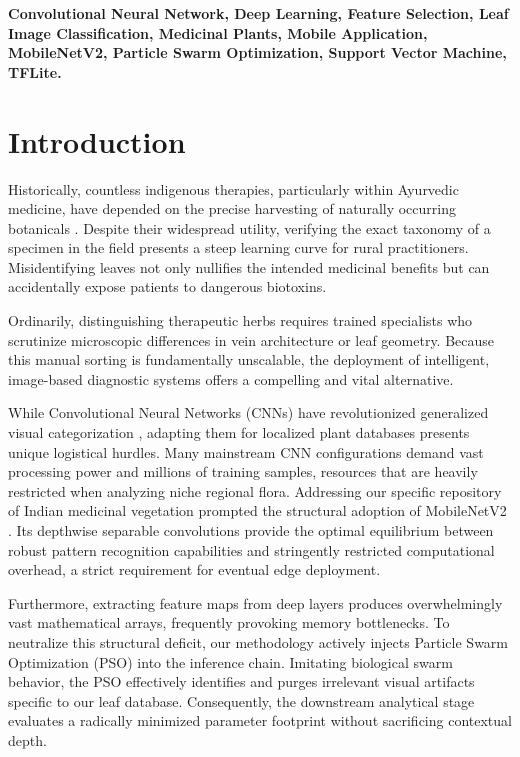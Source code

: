 \documentclass[conference]{IEEEtran}
\begin{document}
\begin{IEEEkeywords}
\textbf{Convolutional Neural Network, Deep Learning, Feature Selection, Leaf Image Classification, Medicinal Plants, Mobile Application, MobileNetV2, Particle Swarm Optimization, Support Vector Machine, TFLite.}
\end{IEEEkeywords}

\section{Introduction}

Historically, countless indigenous therapies, particularly within Ayurvedic medicine, have depended on the precise harvesting of naturally occurring botanicals \cite{pandey2014}. Despite their widespread utility, verifying the exact taxonomy of a specimen in the field presents a steep learning curve for rural practitioners. Misidentifying leaves not only nullifies the intended medicinal benefits but can accidentally expose patients to dangerous biotoxins.

Ordinarily, distinguishing therapeutic herbs requires trained specialists who scrutinize microscopic differences in vein architecture or leaf geometry. Because this manual sorting is fundamentally unscalable, the deployment of intelligent, image-based diagnostic systems offers a compelling and vital alternative.

While Convolutional Neural Networks (CNNs) have revolutionized generalized visual categorization \cite{lecun2015, he2016, yosinski2014}, adapting them for localized plant databases presents unique logistical hurdles. Many mainstream CNN configurations demand vast processing power and millions of training samples, resources that are heavily restricted when analyzing niche regional flora. Addressing our specific repository of Indian medicinal vegetation prompted the structural adoption of MobileNetV2 \cite{howard2018}. Its depthwise separable convolutions provide the optimal equilibrium between robust pattern recognition capabilities and stringently restricted computational overhead, a strict requirement for eventual edge deployment.

Furthermore, extracting feature maps from deep layers produces overwhelmingly vast mathematical arrays, frequently provoking memory bottlenecks. To neutralize this structural deficit, our methodology actively injects Particle Swarm Optimization (PSO) \cite{kennedy1995} into the inference chain. Imitating biological swarm behavior, the PSO effectively identifies and purges irrelevant visual artifacts specific to our leaf database. Consequently, the downstream analytical stage evaluates a radically minimized parameter footprint without sacrificing contextual depth.
\end{document}
